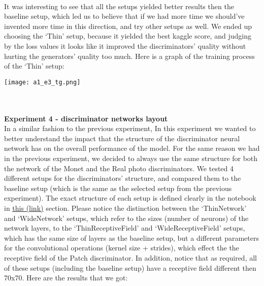 \documentclass{article}
\begin{document}
\begin{table}[!ht]
    \centering
\end{table}
\\
It was interesting to see that all the setups yielded better results then the baseline setup, which led us to believe that if we had more time we should’ve invented more time in this direction, and try other setups as well. We ended up choosing the ‘Thin’ setup, because it yielded the best kaggle score, and judging by the loss values it looks like it improved the discriminators’ quality without hurting the generators’ quality too much. Here is a graph of the training process of the ‘Thin’ setup:

\begin{center}
    \texttt{[image: a1\_e3\_tg.png]}
\end{center}
\\\\
\newblock
\textbf{Experiment 4 - discriminator networks layout}
\\
In a similar fashion to the previous experiment, In this experiment we wanted to better understand the impact that the structure of the discriminator neural network has on the overall performance of the model. For the same reason we had in the previous experiment, we decided to always use the same structure for both the network of the Monet and the Real photo discriminators. We tested 4 different setups for the discriminators’ structure, and compared them to the baseline setup (which is the same as the selected setup from the previous experiment). The exact structure of each setup is defined clearly in the notebook in \href{https://colab.research.google.com/drive/1HVOYKNO_Wr5gIPydsSINsGEhfxGbsWXr?usp=sharing#scrollTo=Build_patch_discriminator_model}{this (link)} section. Please notice the distinction between the ‘ThinNetwork’ and ‘WideNetwork’ setups, which refer to the sizes (number of neurons) of the network layers, to the ‘ThinReceptiveField’ and ‘WideReceptiveField’ setups, which has the same size of layers as the baseline setup, but a different parameters for the convolutional operations (kernel size + strides), which effect the the receptive field of the Patch discriminator. In addition, notice that as required, all of these setups (including the baseline setup) have a receptive field different then 70x70. Here are the results that we got:
\end{document}
